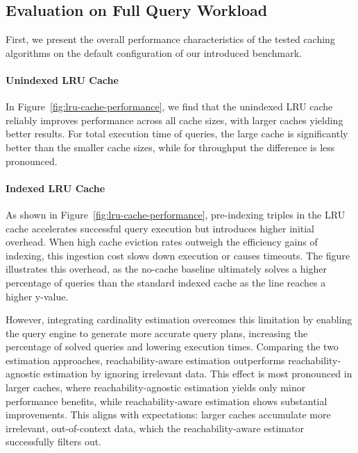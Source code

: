 \subsection{Evaluation on Full Query Workload}

First, we present the overall performance characteristics of the tested caching algorithms on the default configuration
of our introduced benchmark.

\paragraph{Unindexed LRU Cache}

In Figure~\ref{fig:lru-cache-performance}, we find that the unindexed LRU cache reliably improves performance 
across all cache sizes, with larger caches yielding better results.
For total execution time of queries, the large cache is significantly better than the smaller cache sizes, while for
throughput the difference is less pronounced.


\paragraph{Indexed LRU Cache}
As shown in Figure~\ref{fig:lru-cache-performance}, 
pre-indexing triples in the LRU cache accelerates successful query execution
but introduces higher initial overhead. 
When high cache eviction rates outweigh the efficiency gains of indexing, 
this ingestion cost slows down execution or causes timeouts. 
The figure illustrates this overhead, as the no-cache baseline ultimately solves a higher percentage 
of queries than the standard indexed cache as the line reaches a higher y-value. 

However, integrating cardinality estimation overcomes this limitation 
by enabling the query engine to generate more accurate query plans, 
increasing the percentage of solved queries and lowering execution times. 
Comparing the two estimation approaches, reachability-aware estimation 
outperforms reachability-agnostic estimation by ignoring irrelevant data. 
This effect is most pronounced in larger caches, where reachability-agnostic estimation 
yields only minor performance benefits, while reachability-aware estimation shows substantial improvements. 
This aligns with expectations: larger caches accumulate more irrelevant, 
out-of-context data, which the reachability-aware estimator successfully filters out.




